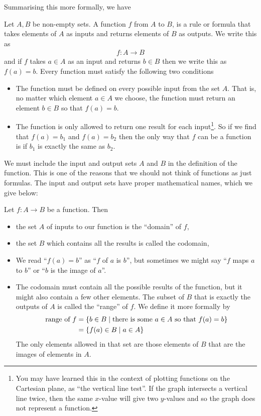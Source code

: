 Summarising this more formally, we have
\begin{defn}
\label{def function}
 Let $A, B$ be non-empty sets. A function $f$ from $A$ to $B$, is a rule or
formula that takes elements of $A$ as inputs and returns elements of $B$ as
outputs. We write this as
\begin{align*}
  f: A \to B
\end{align*}
and if $f$ takes $a \in A$ as an input and returns $b\in B$ then we write this
as $f(a) = b$. Every function must satisfy the following two conditions
\begin{itemize}
\item The function must be defined on every possible input from the set $A$.
That is, no matter which element $a \in A$ we choose, the function must return
an element $b \in B$ so that $f(a)=b$.

\item The function is only allowed to return one result for each
input\footnote{You may have learned this in the context of plotting functions on
the Cartesian plane, as ``the vertical line test''. If the graph intersects a
vertical line twice, then the same $x$-value will give two $y$-values and so
the graph does not represent a function.}. So if we find that $f(a)=b_1$ and
$f(a)=b_2$ then the only way that $f$ can be a function is if $b_1$ is exactly
the same as $b_2$.
\end{itemize}
\end{defn}
We must include the input and output sets $A$ and $B$ in the definition of the
function. This is one of the reasons that we should not think of
functions as just formulas. The input and output sets have proper mathematical
names, which we give below:
\begin{defn}\label{def_0_4_1}
Let $f:A \to B$ be a function. Then
\begin{itemize}
\item the set $A$ of inputs to our function is the ``domain'' of $f$,
\item the set $B$ which contains all the results is called the codomain,
\item We read ``$f(a) = b$'' as ``$f$ of $a$ is $b$'', but sometimes we might
say ``$f$ maps $a$ to $b$'' or ``$b$ is the image of $a$''.

\item The codomain must contain all the possible results of the function, but
it might also contain a few other elements. The subset of $B$ that is
exactly the outputs of $A$ is called the ``range'' of $f$. We define it more
formally by
\begin{align*}
	\text{range of } f &= \left\{b \in B \;|\; \text{there is some } a \in
A \text{ so that } f(a) = b\right\} \\
  &= \left\{f(a) \in B \;|\; a \in A\right\}
\end{align*}
  The only elements allowed in that set are those elements of $B$ that are the
images of elements in $A$.
\end{itemize}
\end{defn}


